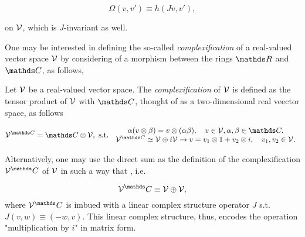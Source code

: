 \begin{equation}\label{Complex_Manifolds_skew_symmetric_form}
    \Omega(v,v') \equiv h(Jv, v'),
\end{equation}

on $\mathcal{V}$, which is $J$-invariant as well. \smallbreak

One may be interested in defining the so-called \textit{complexification} of a real-valued vector space $\mathcal{V}$ by considering of a morphism between the rings $\R$ and $\C$, as follows,

\begin{df}
    \textnormal{Let $\mathcal{V}$ be a real-valued vector space. The \textit{complexification} of $\mathcal{V}$ is defined as the tensor product of $\mathcal{V}$ with $\C$, thought of as a two-dimensional real veector space, as follows}
        
        \begin{equation*}
            \vectorspace^{\C} = \C \otimes \vectorspace, \textnormal{ s.t. } \begin{array}{cc}
                 \alpha(v \otimes \beta) = v \otimes (\alpha \beta), \quad v \in \vectorspace, \alpha, \beta \in \C. \\
                 \vectorspace^{\C} \simeq \vectorspace \oplus i \vectorspace \rightarrow v = v_1 \otimes 1 + v_2 \otimes i, \quad v_1, v_2 \in \vectorspace.
            \end{array}
        \end{equation*}
    
    \textnormal{Alternatively, one may use the direct sum as the definition of the complexification $\vectorspace^\C$ of $\mathcal{V}$ in such a way that , i.e.}
    
    $$
        \vectorspace^\C \equiv \vectorspace \oplus \vectorspace,
    $$    
    \textnormal{ where $\vectorspace^\C$ is imbued with a linear complex structure operator $J$ s.t. 
    $J(v,w) \equiv (-w, v)$. This linear complex structure, thus, encodes the operation "multiplication by $i$" in matrix form. 
    }
\end{df}

